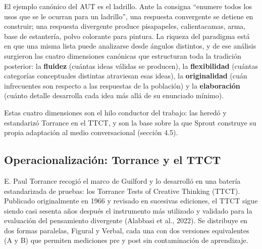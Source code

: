 \documentclass[12pt,twoside,titlepage]{report}
\begin{document}
El ejemplo canónico del AUT es el ladrillo. Ante la consigna ``enumere todos los usos que se le ocurran para un ladrillo'', una respuesta convergente se detiene en construir; una respuesta divergente produce pisapapeles, calientacamas, arma, base de estantería, polvo colorante para pintura. La riqueza del paradigma está en que una misma lista puede analizarse desde ángulos distintos, y de ese análisis surgieron las cuatro dimensiones canónicas que estructuran toda la tradición posterior: la \textbf{fluidez} (cuántas ideas válidas se producen), la \textbf{flexibilidad} (cuántas categorías conceptuales distintas atraviesan esas ideas), la \textbf{originalidad} (cuán infrecuentes son respecto a las respuestas de la población) y la \textbf{elaboración} (cuánto detalle desarrolla cada idea más allá de su enunciado mínimo).

Estas cuatro dimensiones son el hilo conductor del trabajo: las heredó y estandarizó Torrance en el TTCT, y son la base sobre la que Sprout construye su propia adaptación al medio conversacional (sección 4.5).

\subsection{Operacionalización: Torrance y el TTCT}

E. Paul Torrance recogió el marco de Guilford y lo desarrolló en una batería estandarizada de pruebas: los Torrance Tests of Creative Thinking (TTCT). Publicado originalmente en 1966 y revisado en sucesivas ediciones, el TTCT sigue siendo casi sesenta años después el instrumento más utilizado y validado para la evaluación del pensamiento divergente (Alabbasi et al., 2022). Se distribuye en dos formas paralelas, Figural y Verbal, cada una con dos versiones equivalentes (A y B) que permiten mediciones pre y post sin contaminación de aprendizaje.
\end{document}
